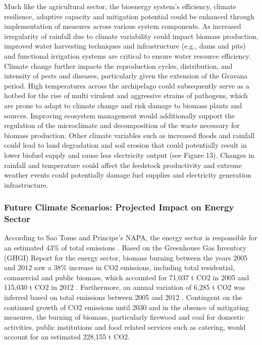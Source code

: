 \documentclass[
]{book}
\begin{document}
Much like the agricultural sector, the bioenergy system's efficiency, climate resilience, adaptive capacity and mitigation potential could be enhanced through implementation of measures across various system components. As increased irregularity of rainfall due to climate variability could impact biomass production, improved water harvesting techniques and infrastructure (e.g., dams and pits) and functional irrigation systems are critical to ensure water resource efficiency. Climate change further impacts the reproduction cycles, distribution, and intensity of pests and diseases, particularly given the extension of the Gravana period. High temperatures across the archipelago could subsequently serve as a hotbed for the rise of multi virulent and aggressive strains of pathogens, which are prone to adapt to climate change and risk damage to biomass plants and sources. Improving ecosystem management would additionally support the regulation of the microclimate and decomposition of the waste necessary for biomass production. Other climate variables such as increased floods and rainfall could lead to land degradation and soil erosion that could potentially result in lower biofuel supply and cause less electricity output (see Figure 13). Changes in rainfall and temperature could affect the feedstock productivity and extreme weather events could potentially damage fuel supplies and electricity generation infrastructure.

\hypertarget{future-climate-scenarios-projected-impact-on-energy-sector}{%
\subsubsection{Future Climate Scenarios: Projected Impact on Energy Sector}\label{future-climate-scenarios-projected-impact-on-energy-sector}}

According to Sao Tome and Principe's NAPA, the energy sector is responsible for an estimated 43\% of total emissions . Based on the Greenhouse Gas Inventory (GHGI) Report for the energy sector, biomass burning between the years 2005 and 2012 saw a 38\% increase in CO2 emissions, including total residential, commercial and public biomass, which accounted for 71,037 t CO2 in 2005 and 115,030 t CO2 in 2012 . Furthermore, an annual variation of 6,285 t CO2 was inferred based on total emissions between 2005 and 2012 . Contingent on the continued growth of CO2 emissions until 2030 and in the absence of mitigating measures, the burning of biomass, particularly firewood and coal for domestic activities, public institutions and food related services such as catering, would account for an estimated 228,155 t CO2.
\end{document}
